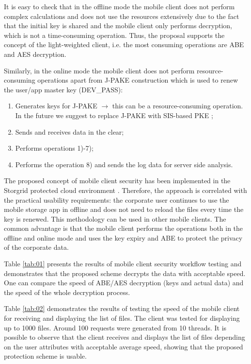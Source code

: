 \documentclass[twocolumn]{svjour3}          	%
\begin{document}
It is easy to check that in the offline mode the mobile client does not perform complex calculations and does not use the resources extensively due to the fact that the initial key is shared and the mobile client only performs decryption, which is not a time-consuming operation. Thus, the proposal supports the concept of the light-weighted client, i.e. the most consuming operations are ABE and AES decryption. 

Similarly, in the online mode the mobile client does not perform resource-consuming operations apart from J-PAKE construction which is used to renew the user/app master key (DEV\_PASS):

\begin{enumerate}
	\item Generates keys for J-PAKE $\rightarrow$ this can be a resource-consuming operation. In the future we suggest to replace J-PAKE with SIS-based PKE \cite{bogos2013primeless,bellovin1992encrypted};
	\item Sends and receives data in the clear;
	\item Performs operations 1)-7);
	\item Performs the operation 8) and sends the log data for server side analysis.
\end{enumerate}

The proposed concept of mobile client security has been implemented in the Storgrid protected cloud environment \cite{storgrid2016}. Therefore, the approach is correlated with the practical usability requirements: the corporate user continues to use the mobile storage app in offline and does not need to reload the files every time the key is renewed. This methodology can be used in other mobile clients. The common advantage is that the mobile client performs the operations both in the offline and online mode and uses the key expiry and ABE to protect the privacy of the corporate data. 

Table \ref{tab:01} presents the results of mobile client security workflow testing and demonstrates that the proposed scheme decrypts the data with acceptable speed. One can compare the speed of ABE/AES decryption (keys and actual data) and the speed of the whole decryption process.

Table \ref{tab:02} demonstrates the results of testing the speed of the mobile client for receiving and displaying the list of files. The client was tested for displaying up to 1000 files. Around 100 requests were generated from 10 threads. It is possible to observe that the client receives and displays the list of files depending on the user attributes with acceptable average speed, showing that the proposed protection scheme is usable. 
\end{document}
